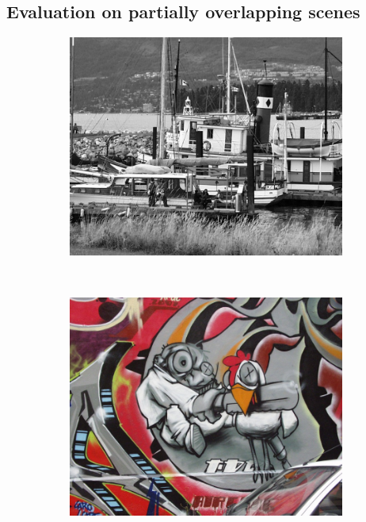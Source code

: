 \documentclass[review]{elsarticle}
\begin{document}
\subsection{Evaluation on partially overlapping scenes}
\label{S:patches}
%
\begin{figure}[b]
    \centering
    \begin{subfigure}[t]{0.20\columnwidth}
        \centering
        \includegraphics[width=1\columnwidth]{images/acr/boat1}
    \end{subfigure}%
    ~ %
    \begin{subfigure}[t]{0.20\columnwidth}
        \centering
        \includegraphics[width=1\columnwidth]{images/acr/graf1}

\end{subfigure}
\end{figure}
\end{document}
